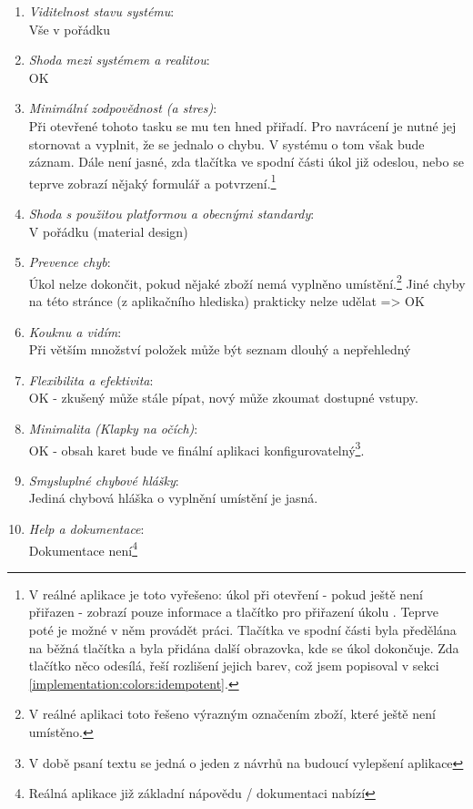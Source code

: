 \begin{enumerate}
  \item \emph{Viditelnost stavu systému}:\\Vše v pořádku
  \item \emph{Shoda mezi systémem a realitou}:\\OK
  \item \emph{Minimální zodpovědnost (a stres)}:\\Při otevřené tohoto tasku se mu ten hned přiřadí. Pro navrácení je nutné jej stornovat a vyplnit, že se jednalo o chybu. V systému o tom však bude záznam. Dále není jasné, zda tlačítka ve spodní části úkol již odeslou, nebo se teprve zobrazí nějaký formulář a potvrzení.\footnote{V reálné aplikace je toto vyřešeno: úkol při otevření - pokud ještě není přiřazen - zobrazí pouze informace a tlačítko pro přiřazení úkolu . Teprve poté je možné v něm provádět práci. Tlačítka ve spodní části byla předělána na běžná tlačítka a byla přidána další obrazovka, kde se úkol dokončuje. Zda tlačítko něco odesílá, řeší rozlišení jejich barev, což jsem popisoval v sekci \ref{implementation:colors:idempotent}.}
  \item \emph{Shoda s použitou platformou a obecnými standardy}:\\V pořádku (material design)
  \item \emph{Prevence chyb}:\\Úkol nelze dokončit, pokud nějaké zboží nemá vyplněno umístění.\footnote{V reálné aplikaci toto řešeno výrazným označením zboží, které ještě není umístěno.} Jiné chyby na této stránce (z aplikačního hlediska) prakticky nelze udělat => OK
  \item \emph{Kouknu a vidím}:\\Při větším množství položek může být seznam dlouhý a nepřehledný
  \item \emph{Flexibilita a efektivita}:\\OK - zkušený může stále pípat, nový může zkoumat dostupné vstupy.
  \item \emph{Minimalita (Klapky na očích)}:\\OK - obsah karet bude ve finální aplikaci konfigurovatelný\footnote{V době psaní textu se jedná o jeden z návrhů na budoucí vylepšení aplikace}.
  \item \emph{Smysluplné chybové hlášky}:\\Jediná chybová hláška o vyplnění umístění je jasná.
  \item \emph{Help a dokumentace}:\\Dokumentace není\footnote{Reálná aplikace již základní nápovědu / dokumentaci nabízí}
\end{enumerate}


